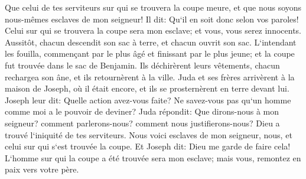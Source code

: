 \verse Que celui de tes serviteurs sur qui se trouvera la coupe meure, et que nous soyons nous-mêmes esclaves de mon seigneur! 
\verse Il dit: Qu`il en soit donc selon vos paroles! Celui sur qui se trouvera la coupe sera mon esclave; et vous, vous serez innocents. 
\verse Aussitôt, chacun descendit son sac à terre, et chacun ouvrit son sac. 
\verse L`intendant les fouilla, commençant par le plus âgé et finissant par le plus jeune; et la coupe fut trouvée dans le sac de Benjamin. 
\verse Ils déchirèrent leurs vêtements, chacun rechargea son âne, et ils retournèrent à la ville. 
\verse Juda et ses frères arrivèrent à la maison de Joseph, où il était encore, et ils se prosternèrent en terre devant lui. 
\verse Joseph leur dit: Quelle action avez-vous faite? Ne savez-vous pas qu`un homme comme moi a le pouvoir de deviner? 
\verse Juda répondit: Que dirons-nous à mon seigneur? comment parlerons-nous? comment nous justifierons-nous? Dieu a trouvé l`iniquité de tes serviteurs. Nous voici esclaves de mon seigneur, nous, et celui sur qui s`est trouvée la coupe. 
\verse Et Joseph dit: Dieu me garde de faire cela! L`homme sur qui la coupe a été trouvée sera mon esclave; mais vous, remontez en paix vers votre père. 
